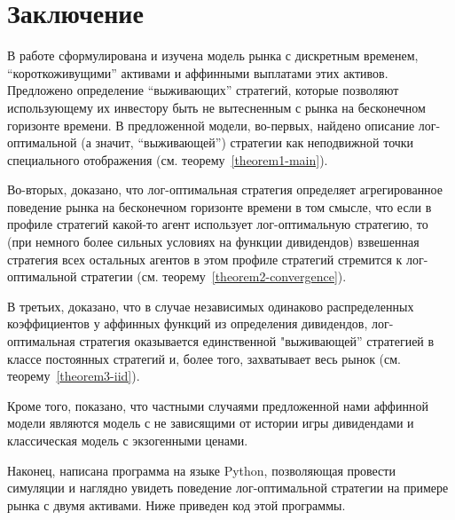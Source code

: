 \documentclass[a4paper,12pt,russian]{article} %
\theoremstyle{definition}
\begin{document}
\section{Заключение}
\label{section7-conclusion}

В работе сформулирована  и изучена модель рынка с дискретным временем, ``короткоживущими'' активами и аффинными выплатами этих активов. Предложено определение ``выживающих'' стратегий, которые позволяют использующему их инвестору быть не вытесненным с рынка на бесконечном горизонте времени. 
В предложенной  модели, во-первых, найдено описание лог-оптимальной (а значит, ``выживающей'') стратегии как неподвижной точки специального отображения (см. теорему~\ref{theorem1-main}). 

Во-вторых, доказано, что лог-оптимальная стратегия определяет агрегированное поведение рынка на бесконечном горизонте времени в том смысле, что если в профиле стратегий какой-то агент использует лог-оптимальную стратегию, то (при немного более сильных условиях на функции дивидендов) взвешенная стратегия всех остальных агентов в этом профиле стратегий стремится к лог-оптимальной стратегии (см. теорему~\ref{theorem2-convergence}).

 В третьих, доказано, что в случае независимых одинаково распределенных коэффициентов у аффинных функций из определения дивидендов, лог-оптимальная стратегия оказывается единственной "выживающей'' стратегией в классе постоянных стратегий и, более того, захватывает весь рынок (см. теорему~\ref{theorem3-iid}).

 Кроме того, показано, что частными случаями предложенной нами аффинной модели являются модель с не зависящими от истории игры дивидендами и классическая модель с экзогенными ценами.

 Наконец, написана программа на языке Python, позволяющая провести симуляции и наглядно увидеть поведение лог-оптимальной стратегии на примере рынка с двумя активами. Ниже приведен код этой программы.
\end{document}
